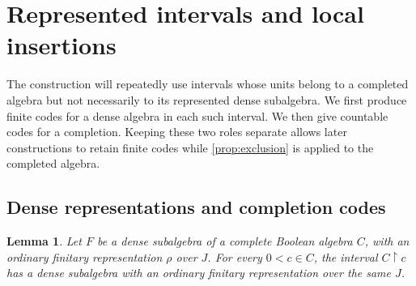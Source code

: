 \documentclass[11pt]{article}
\newtheorem{lemma}[theorem]{Lemma}
\theoremstyle{definition}
\theoremstyle{remark}
\newcommand{\restr}{\mathbin{\upharpoonright}}
\begin{document}
\section{Represented intervals and local insertions}
\label{sec:completion-codes}

The construction will repeatedly use intervals whose units belong to a
completed algebra but not necessarily to its represented dense subalgebra.
We first produce finite codes for a dense algebra in each such interval.
We then give countable codes for a completion.  Keeping these two roles
separate allows later constructions to retain finite codes while
\cref{prop:exclusion} is applied to the completed algebra.

\subsection{Dense representations and completion codes}

\begin{lemma}\label{lem:interval-representation}
Let $F$ be a dense subalgebra of a complete Boolean algebra $C$, with an
ordinary finitary representation $\rho$ over $J$.  For every $0<c\in C$,
the interval $C\restr c$ has a dense subalgebra with an ordinary finitary
representation over the same $J$.
\end{lemma}
\end{document}
